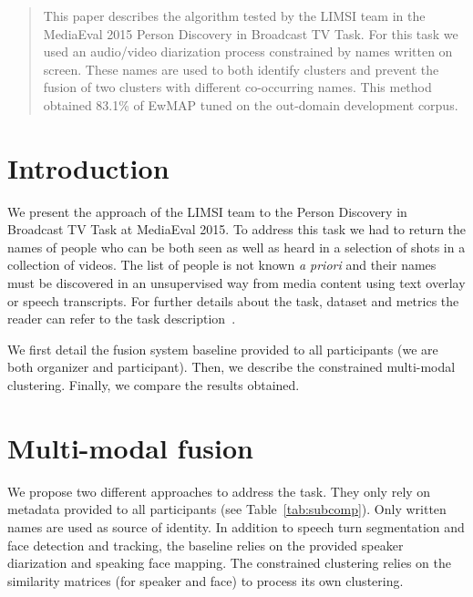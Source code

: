 \documentclass{acm_proc_article-me}
\begin{document}
\maketitle
\begin{abstract}

This paper describes the algorithm tested by the LIMSI team in the MediaEval 2015 Person Discovery in Broadcast TV Task. For this task we used an audio/video diarization process constrained by names written on screen. These names are used to both identify clusters and prevent the fusion of two clusters with different co-occurring names. This method obtained 83.1\% of EwMAP tuned on the out-domain development corpus.

\end{abstract}


\section{Introduction}

We present the approach of the LIMSI team to the Person Discovery in Broadcast TV Task at MediaEval 2015. To address this task we had to return the names of people who can be both seen as well as heard in a selection of shots in a collection of videos. The list of people is not known \emph{a priori} and their names must be discovered in an unsupervised way from media content using text overlay or speech transcripts. For further details about the task, dataset and metrics the reader can refer to the task description~\cite{POIGNANT--MEDIAEVAL--2015}.

We first detail the fusion system baseline provided to all participants (we are both organizer and participant). Then, we describe the constrained multi-modal clustering. Finally, we compare the results obtained.

\section{Multi-modal fusion}

We propose two different approaches to address the task. They only rely on metadata provided to all participants (see Table~\ref{tab:subcomp}). Only written names are used as source of identity. In addition to speech turn segmentation and face detection and tracking, the baseline relies on the provided speaker diarization and speaking face mapping. The constrained clustering relies on the similarity matrices (for speaker and face) to process its own clustering.
\end{document}
